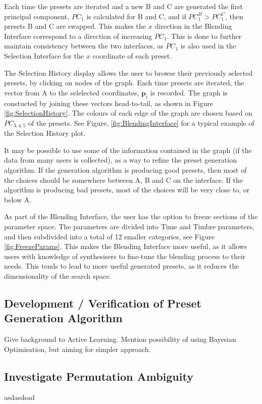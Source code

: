 \documentclass[11pt, oneside]{report}   	%
\renewcommand{\vec}[1]{\mathbf{#1}}
\begin{document}
Each time the presets are iterated and a new B and C are generated the first principal component, $PC_{1}$ is calculated for B and C, and if $PC_{1}^B > PC_{1}^C $, then presets B and C are swapped. This makes the $x$ direction in the Blending Interface correspond to a direction of increasing $PC_{1}$. This is done to further maintain consistency between the two interfaces, as $PC_{1}$ is also used in the Selection Interface for the $x$ coordinate of each preset.

The Selection History display allows the user to browse their previously selected presets, by clicking on nodes of the graph. Each time presets are iterated, the vector from A to the selelected coordinates, $\vec{p}_i$ is recorded. The graph is constucted by joining these vectors head-to-tail, as shown in Figure \ref{fig:SelectionHistory}. The colours of each edge of the graph are chosen based on $PC_{3,4,5}$ of the presets. See Figure, \ref{fig:BlendingInterface} for a typical example of the Selection History plot.

It may be possible to use some of the information contained in the graph (if the data from many users is collected), as a way to refine the preset generation algorithm. If the generation algorithm is producing good presets, then most of the choices should be somewhere between A, B and C on the interface. If the algorithm is producing bad presets, most of the choices will be very close to, or below A.

As part of the Blending Interface, the user has the option to freeze sections of the parameter space. The parameters are divided into Time and Timbre parameters, and then subdivided into a total of 12 smaller categories, see Figure \ref{fig:FreezeParams}. This makes the Blending Interface more useful, as it allows users with knowledge of synthesisers to fine-tune the blending process to their needs. This tends to lead to more useful generated presets, as it reduces the dimensionality of the search space.

\subsection{Development / Verification of Preset Generation Algorithm} \label{sec:PresetGeneration}
Give background to Active Learning. Mention possibility of using Bayesian Optimisation, but aiming for simpler approach. 


\subsection{Investigate Permutation Ambiguity}
asdasdsad
\end{document}
